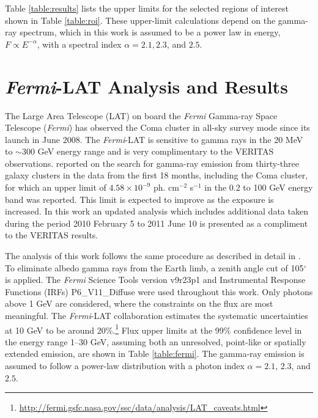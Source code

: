 \documentclass[12pt,manuscript]{aastex}
\def\Fermi{{\em Fermi}\xspace}
\begin{document}
Table \ref{table:results} lists the upper limits for the selected regions of interest shown in
Table \ref{table:roi}. These upper-limit calculations depend on the gamma-ray spectrum, which in
this work is assumed to be a power law in energy, $F\propto E^{-\alpha}$, with a spectral index
$\alpha=2.1, 2.3$, and $2.5$.

%
%

\section{\Fermi-LAT Analysis and Results}
The Large Area Telescope (LAT) on board the \Fermi Gamma-ray Space Telescope (\Fermi)
has observed the Coma cluster in all-sky survey mode since its launch in June 2008. The
\Fermi-LAT is sensitive to gamma rays in the 20 MeV to $\sim$300 GeV energy range and is
very complimentary to the VERITAS observations. \citet{article:Ackermann_etal:2010} reported on the
search for gamma-ray emission from thirty-three galaxy clusters in the data from the first 18
months, including the Coma cluster, for which an upper limit of $4.58\times 10^{-9}$ ph. cm$^{-2}$
s$^{-1}$ in the 0.2 to 100 GeV energy band was reported. This limit is expected to improve as the
exposure is increased. In this work an updated analysis which includes additional data taken during
the period 2010 February 5 to 2011 June 10 is presented as a compliment to the VERITAS results.

The analysis of this work follows the same procedure as described in detail in
\citet{article:Abdo_etal:2009}. To eliminate albedo gamma rays from the Earth limb, a zenith angle
cut of 105$^{\circ}$ is applied. The \Fermi Science Tools version v9r23p1 and Instrumental
Response Functions (IRFs) P6\_V11\_Diffuse were used throughout this work. Only photons above 1 GeV
are considered, where the constraints on the flux are most meaningful. The \Fermi-LAT collaboration
estimates the systematic uncertainties at 10 GeV to be around
20\%.\footnote{\url{http://fermi.gsfc.nasa.gov/ssc/data/analysis/LAT\_caveats.html}} Flux upper
limits at the 99\% confidence level in the energy range 1--30 GeV, assuming both an unresolved,
point-like or spatially extended emission, are shown in Table \ref{table:fermi}. The gamma-ray
emission is assumed to follow a power-law distribution with a photon index $\alpha=2.1$, 2.3, and
$2.5$.

%
%
\end{document}
